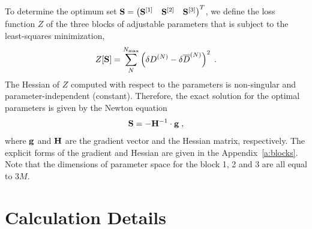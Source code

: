 \documentclass[aip,amsmath,amssymb,reprint,floatfix]{revtex4-1}
\begin{document}
To determine the optimum set 
$
 {\bf S} = 
\begin{pmatrix}
{\bf S}^{[1]} &
{\bf S}^{[2]} &
{\bf S}^{[3]}
\end{pmatrix}^T
$, we define the loss function $Z$ 
of the three blocks of adjustable parameters
that is subject to the least\hyp{}squares minimization,
%
\begin{equation}\label{e:Z}
 Z[{\bf S}] = \sum_N^{N_{\rm max}} \left( \delta D^{(N)} - \delta \overline{D}^{(N)} \right)^2 \;.
\end{equation}
%
The Hessian of $Z$ computed with respect to the parameters is non\hyp{}singular
and parameter\hyp{}independent (constant).
Therefore, the exact solution for the optimal parameters is given by the Newton equation
%
\begin{equation}\label{e:Newton}
 {\bf S} = -{\bf H}^{-1} \cdot {\bf g} \;,
\end{equation}
%
where ${\bf g}$ and ${\bf H}$ are the gradient vector and the Hessian matrix, respectively.
%
%
The explicit forms of the gradient and Hessian are given in the Appendix~\ref{a:blocks}.
Note that the dimensions of parameter space for the block 1, 2 and 3 are all
equal to $3M$.

\section{\label{s:3}Calculation Details}
\end{document}
